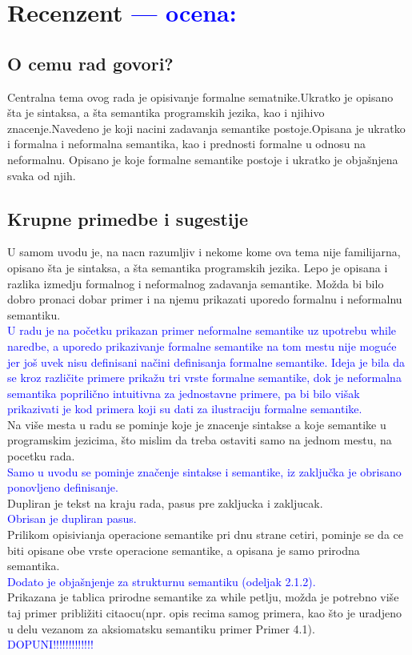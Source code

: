 \documentclass[a4paper]{report}
\newcommand{\odgovor}[1]{\textcolor{blue}{#1}}
\begin{document}
\chapter{Recenzent \odgovor{--- ocena:} }


\section{O cemu rad govori?}

Centralna tema ovog rada je  opisivanje formalne sematnike.Ukratko je opisano šta je sintaksa, a šta semantika programskih jezika, kao i njihivo znacenje.Navedeno je koji nacini zadavanja semantike postoje.Opisana je ukratko i formalna i neformalna semantika, kao i prednosti formalne u odnosu na neformalnu. Opisano je koje formalne semantike postoje i ukratko je objašnjena svaka od njih. 


\section{Krupne primedbe i sugestije}

U samom uvodu je, na nacn razumljiv i nekome kome ova tema nije familijarna, opisano šta je sintaksa, a šta semantika programskih jezika. Lepo je opisana i razlika izmedju formalnog i neformalnog zadavanja semantike. Možda bi bilo dobro pronaci dobar primer i na njemu prikazati uporedo formalnu i neformalnu semantiku.\\
\odgovor{U radu je na početku prikazan primer neformalne semantike uz upotrebu while naredbe, a uporedo prikazivanje formalne semantike na tom mestu nije moguće jer još uvek nisu definisani načini definisanja formalne semantike. Ideja je bila da se kroz različite primere prikažu tri vrste formalne semantike, dok je neformalna semantika poprilično intuitivna za jednostavne primere, pa bi bilo višak prikazivati je kod primera koji su dati za ilustraciju formalne semantike.}\\
 Na više mesta u radu se pominje koje je znacenje sintakse a koje semantike u programskim jezicima, što mislim da treba ostaviti samo na jednom mestu, na pocetku rada. \\
\odgovor{Samo u uvodu se pominje značenje sintakse i semantike, iz zaključka je obrisano ponovljeno definisanje.}\\
Dupliran je tekst na kraju rada, pasus pre zakljucka i zakljucak. \\
\odgovor{Obrisan je dupliran pasus.}\\
Prilikom opisivianja operacione semantike pri dnu strane cetiri, pominje se da ce biti opisane obe vrste operacione semantike, a opisana je samo prirodna  semantika.\\
\odgovor{Dodato je objašnjenje za strukturnu semantiku (odeljak 2.1.2).}\\
 Prikazana je tablica prirodne semantike za while petlju, možda je potrebno više taj primer približiti citaocu(npr. opis recima samog primera, kao što je uradjeno u delu vezanom za aksiomatsku semantiku primer Primer 4.1).    
\\
\odgovor{DOPUNI!!!!!!!!!!!!!}\\
\end{document}
